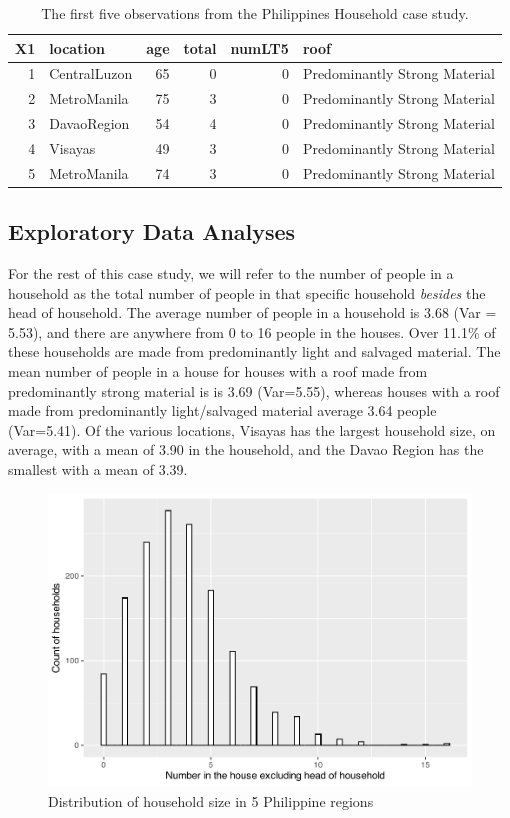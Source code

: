 \documentclass[
]{krantz}
\begin{document}
\begin{table}

\caption{\label{tab:fHH1table1}The first five observations from the Philippines Household case study.}
\centering
\begin{tabular}[t]{rlrrrl}
\toprule
X1 & location & age & total & numLT5 & roof\\
\midrule
1 & CentralLuzon & 65 & 0 & 0 & Predominantly Strong Material\\
2 & MetroManila & 75 & 3 & 0 & Predominantly Strong Material\\
3 & DavaoRegion & 54 & 4 & 0 & Predominantly Strong Material\\
4 & Visayas & 49 & 3 & 0 & Predominantly Strong Material\\
5 & MetroManila & 74 & 3 & 0 & Predominantly Strong Material\\
\bottomrule
\end{tabular}
\end{table}

\hypertarget{exploreHH}{%
\subsection{Exploratory Data Analyses}\label{exploreHH}}

For the rest of this case study, we will refer to the number of people in a household as the total number of people in that specific household \emph{besides} the head of household. The average number of people in a household is 3.68 (Var = 5.53), and there are anywhere from 0 to 16 people in the houses. Over 11.1\% of these households are made from predominantly light and salvaged material. The mean number of people in a house for houses with a roof made from predominantly strong material is is 3.69 (Var=5.55), whereas houses with a roof made from predominantly light/salvaged material average 3.64 people (Var=5.41). Of the various locations, Visayas has the largest household size, on average, with a mean of 3.90 in the household, and the Davao Region has the smallest with a mean of 3.39.

\begin{figure}

{\centering \includegraphics[width=0.6\linewidth]{bookdown-BeyondMLR_files/figure-latex/nhouse-1} 

}

\caption{Distribution of household size in 5 Philippine regions}\label{fig:nhouse}
\end{figure}
\end{document}
